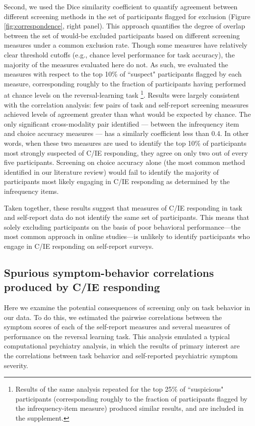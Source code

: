 \documentclass[a4paper,notitlepage,12pt]{article}
\begin{document}
\begin{refsection}[main]
Second, we used the Dice similarity coefficient to quantify agreement between different screening methods in the set of participants flagged for exclusion (Figure \ref{fig:correspondence}, right panel). This approach quantifies the degree of overlap between the set of would-be excluded participants based on different screening measures under a common exclusion rate. Though some measures have relatively clear threshold cutoffs (e.g., chance level performance for task accuracy), the majority of the measures evaluated here do not. As such, we evaluated the measures with respect to the top 10\% of ``suspect" participants flagged by each measure, corresponding roughly to the fraction of participants having performed at chance levels on the reversal-learning task \footnote{Results of the same analysis repeated for the top 25\% of ``suspicious" participants (corresponding roughly to the fraction of participants flagged by the infrequency-item measure) produced similar results, and are included in the supplement.}. Results were largely consistent with the correlation analysis: few pairs of task and self-report screening measures achieved levels of agreement greater than what would be expected by chance. The only significant cross-modality pair identified --- between the infrequency item and choice accuracy measures --- has a similarly coefficient less than 0.4. In other words, when these two measures are used to identify the top 10\% of participants most strongly suspected of C/IE responding, they agree on only two out of every five participants. Screening on choice accuracy alone (the most common method identified in our literature review) would fail to identify the majority of participants most likely engaging in C/IE responding as determined by the infrequency items.

Taken together, these results suggest that measures of C/IE responding in task and self-report data do not identify the same set of participants. This means that solely excluding participants on the basis of poor behavioral performance---the most common approach in online studies---is unlikely to identify participants who engage in C/IE responding on self-report surveys. 

\subsection{Spurious symptom-behavior correlations produced by C/IE responding}

Here we examine the potential consequences of screening only on task behavior in our data. To do this, we estimated the pairwise correlations between the symptom scores of each of the self-report measures and several measures of performance on the reversal learning task. This analysis emulated a typical computational psychiatry analysis, in which the results of primary interest are the correlations between task behavior and self-reported psychiatric symptom severity.


\end{refsection}
\end{document}
